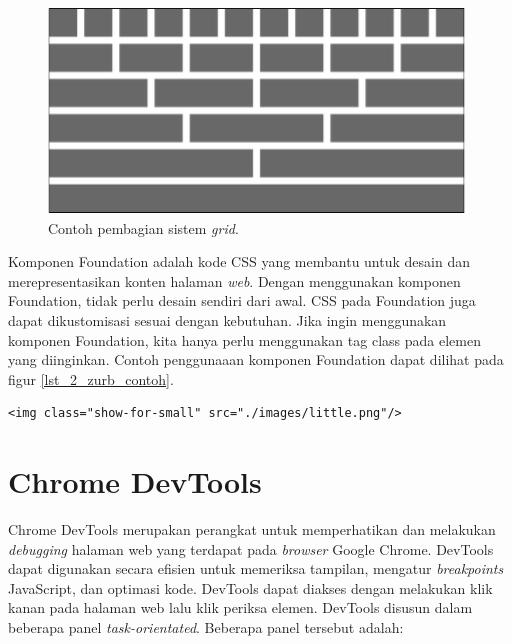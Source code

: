 \begin{figure}[H]
	\centering
	\includegraphics[scale=0.5]{Gambar/zurb-grid}
	\caption{Contoh pembagian sistem \textit{grid}.} 
	\label{fig:2_zurb_grid}
\end{figure}

Komponen Foundation adalah kode CSS  yang membantu untuk desain dan merepresentasikan konten halaman \textit{web}. Dengan menggunakan komponen Foundation, tidak perlu desain sendiri dari awal. CSS pada Foundation juga dapat dikustomisasi sesuai dengan kebutuhan. Jika ingin menggunakan komponen Foundation, kita hanya perlu menggunakan tag class pada elemen yang diinginkan. Contoh penggunaaan komponen Foundation dapat dilihat pada figur \ref{lst_2_zurb_contoh}.

\begin{lstlisting}[caption=Menggunakan kelas yang sudah disediakan dari Foundation,label = {lst_2_zurb_contoh}]
	<img class="show-for-small" src="./images/little.png"/>
\end{lstlisting}

\section{Chrome DevTools}
\label{sec:devtools}
Chrome DevTools\cite{devtools} merupakan perangkat untuk memperhatikan dan melakukan \textit{debugging} halaman web yang terdapat pada \textit{browser} Google Chrome. DevTools dapat digunakan secara efisien untuk memeriksa tampilan, mengatur \textit{breakpoints} JavaScript, dan optimasi kode. DevTools dapat diakses dengan melakukan klik kanan pada halaman web lalu klik periksa elemen. DevTools disusun dalam beberapa panel \textit{task-orientated}. Beberapa panel tersebut adalah:

